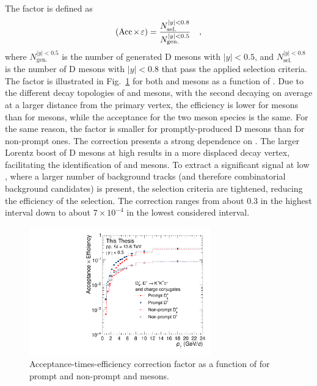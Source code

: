 The \aeff factor is defined as
\begin{equation*}
    (\mathrm{Acc}\mkern-2mu\times\mkern-2mu\varepsilon) = \frac{N_\mathrm{sel.}^{\lvert y\rvert<0.8}}{N_\mathrm{gen.}^{\lvert y\rvert<0.5}}\quad ,
\end{equation*}
where $N_\mathrm{gen.}^{\lvert y\rvert<0.5}$ is the number of generated D mesons with $\lvert y\rvert<0.5$, and $N_\mathrm{sel.}^{\lvert y\rvert<0.8}$ is the number of D mesons with $\lvert y\rvert<0.8$ that pass the applied selection criteria. The \aeff factor is illustrated in Fig.~\ref{fig:Aeff} for both \ds and \dpl mesons as a function of \pt. Due to the different decay topologies of \ds and \dpl mesons, with the second decaying on average at a larger distance from the primary vertex, the efficiency is lower for \ds mesons than for \dpl mesons, while the acceptance for the two meson species is the same. For the same reason, the \aeff factor is smaller for promptly-produced D mesons than for non-prompt ones. The correction presents a strong dependence on \pt. The larger Lorentz boost of D mesons at high \pt results in a more displaced decay vertex, facilitating the identification of \ds and \dpl mesons. To extract a significant signal at low \pt, where a larger number of background tracks (and therefore combinatorial background candidates) is present, the selection criteria are tightened, reducing the efficiency of the selection. The \aeff correction ranges from about 0.3 in the highest \pt interval down to about $7\times 10^{-4}$ in the lowest considered \pt interval.


\begin{figure}[htb]
    \begin{center}
    \includegraphics[width=0.7\textwidth]{Figures/Chapter 6/Efficiency_LHC24d3a.pdf}
    \caption{Acceptance-times-efficiency correction factor as a function of \pt for prompt and non-prompt \ds and \dpl mesons.} 
    \label{fig:Aeff} 
    \end{center}
\end{figure}

